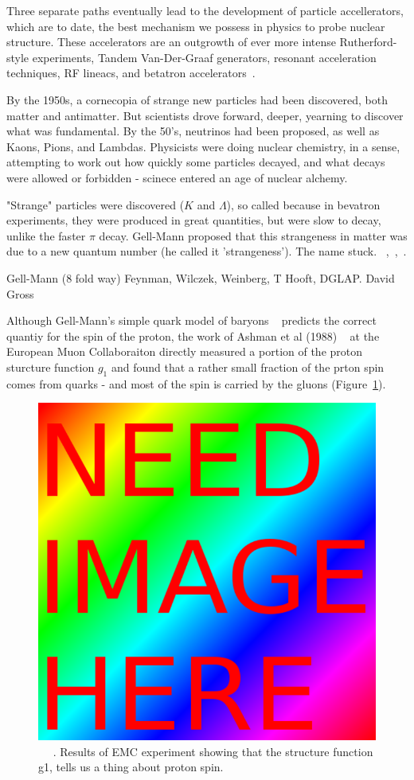 Three separate paths eventually lead to the development of particle
accellerators, which are to date, the best mechanism we possess in physics to
probe nuclear structure. These accelerators are an outgrowth
of ever more intense Rutherford-style experiments, Tandem Van-Der-Graaf
generators, resonant acceleration techniques, RF lineacs, and betatron
accelerators~\cite{Bryant1994}.

By the 1950s, a cornecopia of strange new particles had been discovered, both
matter and antimatter. But scientists drove forward, deeper, yearning to
discover what was fundamental. By the 50's, neutrinos had been proposed, as well
as Kaons, Pions, and Lambdas. Physicists were doing nuclear chemistry, in a
sense, attempting to work out how quickly some particles decayed, and what
decays were allowed or forbidden - scinece entered an age of nuclear alchemy.

"Strange" particles were discovered ($K$ and $\Lambda$), so called because in
bevatron experiments, they were produced in great quantities, but were slow to
decay, unlike the faster $\pi$ decay. Gell-Mann proposed that this strangeness
in matter was due to a new quantum number (he called it 'strangeness'). The name
stuck.
~\cite{Gell-Mann1953},~\cite{Gell-Mann1956},~\cite{KraussParticleHistory}.


Gell-Mann (8 fold way) Feynman, Wilczek, Weinberg, T Hooft, DGLAP. David Gross

Although Gell-Mann's simple quark model of baryons ~\needcite{} predicts the
correct quantiy for the spin of the proton, the work of Ashman et al (1988)
~\needcite{} at the European Muon Collaboraiton directly measured a portion of
the proton sturcture function $g_1$ and found that a rather small fraction of
the prton spin comes from quarks - and most of the spin is carried by the
gluons (Figure~\ref{fig:emc_g1_result}).

\begin{figure}[ht]
	\begin{center}
	\includegraphics[width=0.5\linewidth]{../filler/squareimg.png}
	\caption{~\needfig{} ~\needcap{}. Results of EMC experiment showing that the structure
	function g1, tells us a thing about proton spin.}
	\label{fig:emc_g1_result}
\end{center}
\end{figure}

